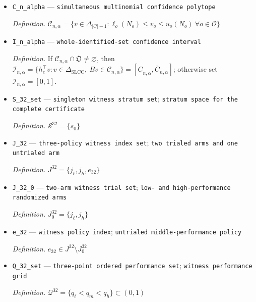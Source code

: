 \documentclass{article}
\begin{document}
\begin{itemize}
  \par\smallskip\noindent\emph{Definition.} the two-sided Clopper--Pearson interval for \(p_o\) at marginal error \(\alpha/|\mathcal O|\)
  \item \texttt{C\_\allowbreak{}n\_\allowbreak{}alpha} --- \texttt{simultaneous multinomial confidence polytope}
  \par\smallskip\noindent\emph{Definition.} \(\mathcal C_{n,\alpha}=\{v\in\Delta_{|\mathcal O|-1}:\ell_o(N_o)\le v_o\le u_o(N_o)\ \forall o\in\mathcal O\}\)
  \item \texttt{I\_\allowbreak{}n\_\allowbreak{}alpha} --- \texttt{whole-\allowbreak{}identified-\allowbreak{}set confidence interval}
  \par\smallskip\noindent\emph{Definition.} If \(\mathcal C_{n,\alpha}\cap\mathfrak O\neq\varnothing\), then \(\mathcal I_{n,\alpha}=\{h_e^{\top}v:v\in\Delta_{\mathrm{SLCC}},\ Bv\in\mathcal C_{n,\alpha}\}=[\underline C_{n,\alpha},\overline C_{n,\alpha}]\); otherwise set \(\mathcal I_{n,\alpha}=[0,1]\).
  \item \texttt{S\_\allowbreak{}32\_\allowbreak{}set} --- \texttt{singleton witness stratum set}; \texttt{stratum space for the complete certificate}
  \par\smallskip\noindent\emph{Definition.} \(\mathcal S^{32}=\{s_0\}\)
  \item \texttt{J\_\allowbreak{}32} --- \texttt{three-\allowbreak{}policy witness index set}; \texttt{two trialed arms and one untrialed arm}
  \par\smallskip\noindent\emph{Definition.} \(J^{32}=\{j_{\ell},j_h,e_{32}\}\)
  \item \texttt{J\_\allowbreak{}32\_\allowbreak{}0} --- \texttt{two-\allowbreak{}arm witness trial set}; \texttt{low-\allowbreak{} and high-\allowbreak{}performance randomized arms}
  \par\smallskip\noindent\emph{Definition.} \(J^{32}_0=\{j_{\ell},j_h\}\)
  \item \texttt{e\_\allowbreak{}32} --- \texttt{witness policy index}; \texttt{untrialed middle-\allowbreak{}performance policy}
  \par\smallskip\noindent\emph{Definition.} \(e_{32}\in J^{32}\setminus J^{32}_0\)
  \item \texttt{Q\_\allowbreak{}32\_\allowbreak{}set} --- \texttt{three-\allowbreak{}point ordered performance set}; \texttt{witness performance grid}
  \par\smallskip\noindent\emph{Definition.} \(\mathcal Q^{32}=\{q_{\ell}<q_m<q_h\}\subset(0,1)\)

\end{itemize}
\end{document}

